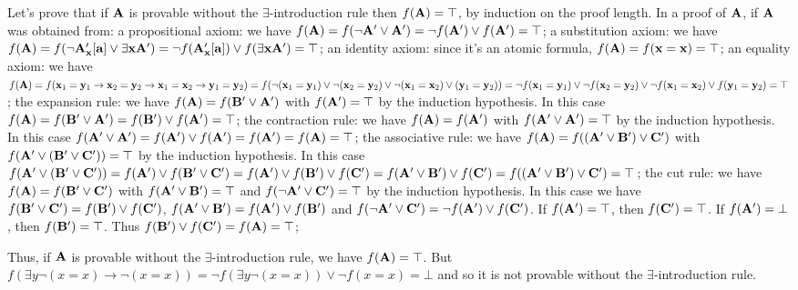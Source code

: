 Let's prove that if ${\bf A}$ is provable without the $\exists$-introduction rule then $f({\bf A}) = \top$, by induction on the proof length.
In a proof of ${\bf A}$, if ${\bf A}$ was obtained from:
\itemitem{$\bullet$} a propositional axiom: we have $f({\bf A}) = f(\neg {\bf A}' \lor {\bf A}') = \neg f({\bf A}') \lor f({\bf A}') = \top$;
\itemitem{$\bullet$} a substitution axiom: we have 
$f({\bf A}) = f(\neg {\bf A}'_{\bf x}[{\bf a}] \lor \exists {\bf x}{\bf A}') = \neg f({\bf A}'_{\bf x}[{\bf a}]) \lor f(\exists {\bf x}{\bf A}') = \top$;
\itemitem{$\bullet$} an identity axiom: since it's an atomic formula, $f({\bf A}) = f({\bf x} = {\bf x}) = \top$;
\itemitem{$\bullet$} an equality axiom: we have $f({\bf A}) = 
f({\bf x}_1 = {\bf y}_1 \to {\bf x}_2 = {\bf y}_2 \to {\bf x}_1 = {\bf x}_2 \to {\bf y}_1 = {\bf y}_2) =
f(\neg ({\bf x}_1 = {\bf y}_1) \lor \neg ({\bf x}_2 = {\bf y}_2) \lor \neg ({\bf x}_1 = {\bf x}_2) \lor ({\bf y}_1 = {\bf y}_2)) =
\neg f({\bf x}_1 = {\bf y}_1) \lor \neg f({\bf x}_2 = {\bf y}_2) \lor \neg f({\bf x}_1 = {\bf x}_2) \lor f({\bf y}_1 = {\bf y}_2) = \top$;
\itemitem{$\bullet$} the expansion rule: we have $f({\bf A}) = f({\bf B}' \lor {\bf A}')$ with $f({\bf A}') = \top$ by the induction hypothesis.
In this case $f({\bf A}) = f({\bf B}' \lor {\bf A}') = f({\bf B}') \lor f({\bf A}') = \top$;
\itemitem{$\bullet$} the contraction rule: we have $f({\bf A}) = f({\bf A}')$ with $f({\bf A}' \lor {\bf A}') = \top$ by the induction hypothesis. 
In this case $f({\bf A}' \lor {\bf A}') = f({\bf A}') \lor f({\bf A}') = f({\bf A}') = f({\bf A}) = \top$;
\itemitem{$\bullet$} the associative rule: we have $f({\bf A}) = f(({\bf A}' \lor {\bf B}') \lor {\bf C}')$ with $f({\bf A}' \lor ({\bf B}' \lor {\bf C}')) = \top$ by the induction hypothesis.
In this case $f({\bf A}' \lor ({\bf B}' \lor {\bf C}')) = f({\bf A}') \lor f({\bf B}' \lor {\bf C}') = f({\bf A}') \lor f({\bf B}') \lor f({\bf C}') =
f({\bf A}' \lor {\bf B}') \lor f({\bf C}') = f(({\bf A}' \lor {\bf B}') \lor {\bf C}') = \top$;
\itemitem{$\bullet$} the cut rule: we have $f({\bf A}) = f({\bf B}' \lor {\bf C}')$ with $f({\bf A}' \lor {\bf B}') = \top$ and $f(\neg {\bf A}' \lor {\bf C}') = \top$ by the induction hypothesis.
In this case we have $f({\bf B}' \lor {\bf C}') = f({\bf B}') \lor f({\bf C}')$, $f({\bf A}' \lor {\bf B}') = f({\bf A}') \lor f({\bf B}')$ and
$f(\neg {\bf A}' \lor {\bf C}') = \neg f({\bf A}') \lor f({\bf C}')$. If $f({\bf A}') = \top$, then $f({\bf C}') = \top$. 
If $f({\bf A}') = \bot$, then $f({\bf B}') = \top$. Thus $f({\bf B}') \lor f({\bf C}') = f({\bf A}) = \top$;

Thus, if ${\bf A}$ is provable without the $\exists$-introduction rule, we have $f({\bf A}) = \top$. 
But $f(\exists y \neg (x=x) \to \neg (x=x)) = \neg f(\exists y \neg (x=x)) \lor \neg f(x=x) = \bot$ and so it is 
not provable without the $\exists$-introduction rule.
\smallskip

\vfill
\break
